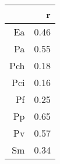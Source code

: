 \begin{table}[ht]
\centering
\begin{tabular}{rr}
  \hline
 & r \\ 
  \hline
Ea & 0.46 \\ 
  Pa & 0.55 \\ 
  Pch & 0.18 \\ 
  Pci & 0.16 \\ 
  Pf & 0.25 \\ 
  Pp & 0.65 \\ 
  Pv & 0.57 \\ 
  Sm & 0.34 \\ 
   \hline
\end{tabular}
\end{table}
